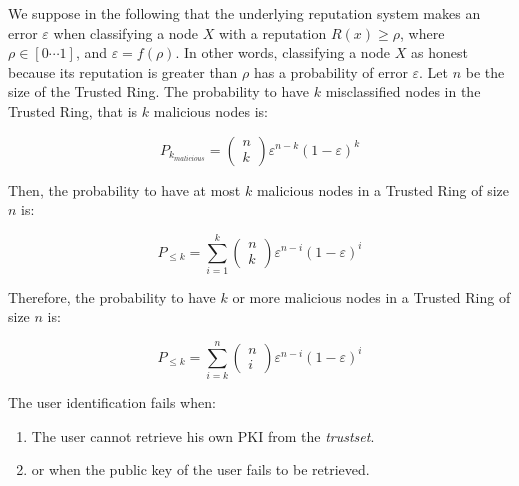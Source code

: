 
We suppose in the following that the underlying
reputation system makes an error $\varepsilon$ when classifying a
node $X$ with a reputation $R(x) \geq \rho$, where $\rho \in [ 0 \cdots 1 ]$,
and $ \varepsilon = f ( \rho )$. In other words, classifying a node $X$ as
honest because its reputation is greater than $\rho$ has a
probability of error $\varepsilon$.
Let $n$ be the size of the Trusted Ring. The probability
to have $k$ misclassified nodes in the Trusted Ring, that
is $k$ malicious nodes is:

$$
P_{k_{malicious}} = \left(\!
                          \begin{array}{c}
                            n\\
                            k
                          \end{array}
                    \!\right)              
                    \varepsilon^{n-k} ( 1 - \varepsilon )^k
$$

Then, the probability to have at most $k$ malicious
nodes in a Trusted Ring of size $n$ is:

$$
P_{\leq k} = \sum^{k}_{i=1} \left(\!
                                \begin{array}{c}
                                    n\\
                                    k
                                  \end{array}
                            \!\right)              
                    \varepsilon^{n-i} ( 1 - \varepsilon )^i
$$

Therefore, the probability to have $k$ or more malicious
nodes in a Trusted Ring of size $n$ is:

$$
P_{\leq k} = \sum^{n}_{i=k} \left(\!
                                \begin{array}{c}
                                    n\\
                                    i
                                  \end{array}
                            \!\right)              
                    \varepsilon^{n-i} ( 1 - \varepsilon )^i
$$

The user identification fails when:
\begin{enumerate}
  \item The user cannot retrieve his own PKI from the \textit{trustset}.
  \item or when the public key of the user fails to be retrieved.
\end{enumerate}

